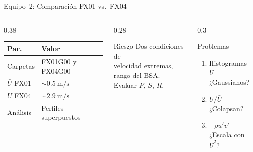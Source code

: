 \documentclass[aspectratio=169,12pt]{beamer}
\begin{document}
\begin{frame}{Equipo~2: Comparación FX01 vs.\ FX04}
	\begin{columns}
		\begin{column}{0.38\textwidth}
			\centering\scriptsize
			\begin{tabular}{ll}
				\toprule
				\textbf{Par.}  & \textbf{Valor}           \\
				\midrule
				Carpetas       & FX01G00 y FX04G00        \\
				$\bar{U}$ FX01 & $\sim\SI{0,5}{\m\per\s}$ \\
				$\bar{U}$ FX04 & $\sim\SI{2,9}{\m\per\s}$ \\
				Análisis       & Perfiles superpuestos    \\
				\bottomrule
			\end{tabular}
		\end{column}
		\begin{column}{0.28\textwidth}
			\begin{alertblock}{\scriptsize Riesgo}
				\scriptsize
				Dos condiciones de\\
				velocidad extremas,\\
				rango del BSA.\\
				Evaluar $P$, $S$, $R$.
			\end{alertblock}
		\end{column}
		\begin{column}{0.3\textwidth}
			\begin{exampleblock}{\scriptsize Problemas}
				\scriptsize
				\begin{enumerate}
					\item[B.1] Histogramas $U$\\
					      ¿Gaussianos?
					\item[B.2] $U/\bar{U}$\\
					      ¿Colapsan?
					\item[B.3] $-\rho\overline{u'v'}$\\
					      ¿Escala con $\bar{U}^2$?
				\end{enumerate}
			\end{exampleblock}
		\end{column}
	\end{columns}
\end{frame}
\end{document}
